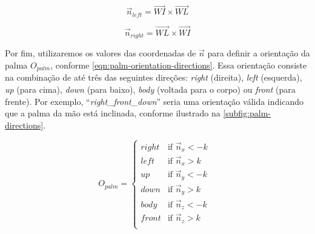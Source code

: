 \begin{enumerate}

          \begin{equation}
              \label{eqn:normal-palm-left}
              \overrightarrow{n}_{left} = \overrightarrow{WI} \times \overrightarrow{WL}
          \end{equation}

          \begin{equation}
              \label{eqn:normal-palm-right}
              \overrightarrow{n}_{right} = \overrightarrow{WL} \times \overrightarrow{WI}
          \end{equation}

          Por fim, utilizaremos os valores das coordenadas de \(\overrightarrow{n}\) para definir a orientação da palma \(O_{palm}\), conforme \autoref{eqn:palm-orientation-directions}.
          Essa orientação consiste na combinação de até três das seguintes direções: \textit{right} (direita), \textit{left} (esquerda), \textit{up} (para cima), \textit{down} (para baixo), \textit{body} (voltada para o corpo) ou \textit{front} (para frente).
          Por exemplo, ``\textit{right\_front\_down}'' seria uma orientação válida indicando que a palma da mão está inclinada, conforme ilustrado na \autoref{subfig:palm-directions}.


          \begin{equation}
              \label{eqn:palm-orientation-directions}
              O_{palm} =
              \begin{cases}
                  right & \text{if $\overrightarrow{n}_x < {-k}$ } \\
                  left  & \text{if $\overrightarrow{n}_x > {k}$ }  \\
                  up    & \text{if $\overrightarrow{n}_y < {-k}$ } \\
                  down  & \text{if $\overrightarrow{n}_y > {k}$ }  \\
                  body  & \text{if $\overrightarrow{n}_z < {-k}$ } \\
                  front & \text{if $\overrightarrow{n}_z > {k}$ }  \\
              \end{cases}
          \end{equation}


\end{enumerate}
